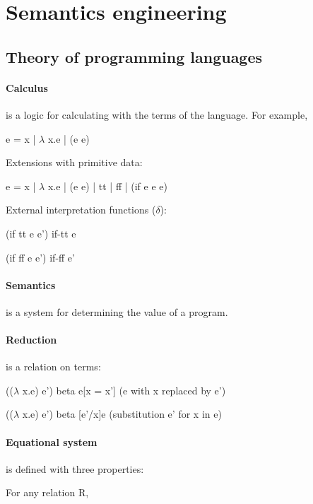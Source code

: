 \section{Semantics engineering}

\subsection{Theory of programming languages}

\paragraph{Calculus} is a logic for calculating with the terms of the language.
For example,

\hspace{\parindent}
e = x | $\lambda$ x.e | (e e)

Extensions with primitive data:

\hspace{\parindent}
e = x | $\lambda$ x.e | (e e) | tt | ff | (if e e e)

External interpretation functions ($\delta$):

\hspace{\parindent}
(if tt e e') if-tt e

\hspace{\parindent}
(if ff e e') if-ff e'

\paragraph{Semantics} is a system for determining the value of a program.

\paragraph{Reduction} is a relation on terms:

\hspace{\parindent}
(($\lambda$ x.e) e') beta e[x = x'] (e with x replaced by e')

\hspace{\parindent}
(($\lambda$ x.e) e') beta [e'/x]e (substitution e' for x in e)

\paragraph{Equational system} is defined with three properties:

For any relation R,

